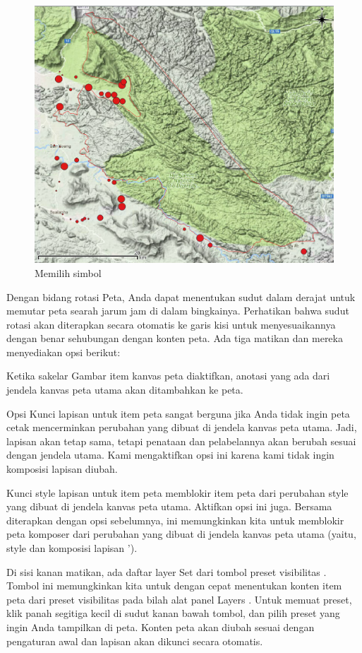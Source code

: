\documentclass[]{book}
\begin{document}
\begin{figure}

{\centering \includegraphics[width=0.6\linewidth]{images/09/fig98} 

}

\caption{Memilih simbol}\label{fig:fig981}
\end{figure}

Dengan bidang rotasi Peta, Anda dapat menentukan sudut dalam derajat untuk memutar peta searah jarum jam di dalam bingkainya. Perhatikan bahwa sudut rotasi akan diterapkan secara otomatis ke garis kisi untuk menyesuaikannya dengan benar sehubungan dengan konten peta. Ada tiga matikan dan mereka menyediakan opsi berikut:

Ketika sakelar Gambar item kanvas peta diaktifkan, anotasi yang ada dari jendela kanvas peta utama akan ditambahkan ke peta.

Opsi Kunci lapisan untuk item peta sangat berguna jika Anda tidak ingin peta cetak mencerminkan perubahan yang dibuat di jendela kanvas peta utama. Jadi, lapisan akan tetap sama, tetapi penataan dan pelabelannya akan berubah sesuai dengan jendela utama. Kami mengaktifkan opsi ini karena kami tidak ingin komposisi lapisan diubah.

Kunci style lapisan untuk item peta memblokir item peta dari perubahan style yang dibuat di jendela kanvas peta utama. Aktifkan opsi ini juga. Bersama diterapkan dengan opsi sebelumnya, ini memungkinkan kita untuk memblokir peta komposer dari perubahan yang dibuat di jendela kanvas peta utama (yaitu, style dan komposisi lapisan ').

Di sisi kanan matikan, ada daftar layer Set dari tombol preset visibilitas . Tombol ini memungkinkan kita untuk dengan cepat menentukan konten item peta dari preset visibilitas pada bilah alat panel Layers . Untuk memuat preset, klik panah segitiga kecil di sudut kanan bawah tombol, dan pilih preset yang ingin Anda tampilkan di peta. Konten peta akan diubah sesuai dengan pengaturan awal dan lapisan akan dikunci secara otomatis.
\end{document}
